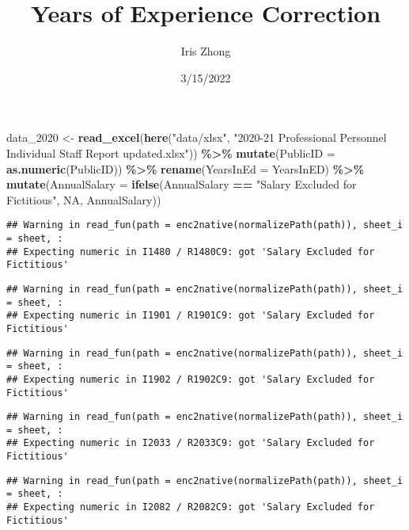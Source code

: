 \documentclass[
]{article}
\title{Years of Experience Correction}
\author{Iris Zhong}
\date{3/15/2022}
\newenvironment{Shaded}{\begin{snugshade}}{\end{snugshade}}
\newcommand{\DataTypeTok}[1]{\textcolor[rgb]{0.13,0.29,0.53}{#1}}
\newcommand{\DecValTok}[1]{\textcolor[rgb]{0.00,0.00,0.81}{#1}}
\newcommand{\KeywordTok}[1]{\textcolor[rgb]{0.13,0.29,0.53}{\textbf{#1}}}
\newcommand{\NormalTok}[1]{#1}
\newcommand{\OperatorTok}[1]{\textcolor[rgb]{0.81,0.36,0.00}{\textbf{#1}}}
\newcommand{\OtherTok}[1]{\textcolor[rgb]{0.56,0.35,0.01}{#1}}
\newcommand{\StringTok}[1]{\textcolor[rgb]{0.31,0.60,0.02}{#1}}
\begin{document}
\maketitle

\begin{Shaded}
\begin{Highlighting}[]
\NormalTok{data\_}\DecValTok{2020}\NormalTok{ \textless{}{-}}\StringTok{ }\KeywordTok{read\_excel}\NormalTok{(}\KeywordTok{here}\NormalTok{(}\StringTok{"data/xlsx"}\NormalTok{, }\StringTok{"2020{-}21 Professional Personnel Individual Staff Report updated.xlsx"}\NormalTok{)) }\OperatorTok{\%\textgreater{}\%}\StringTok{ }
\StringTok{  }\KeywordTok{mutate}\NormalTok{(}\DataTypeTok{PublicID =} \KeywordTok{as.numeric}\NormalTok{(PublicID)) }\OperatorTok{\%\textgreater{}\%}\StringTok{ }
\StringTok{  }\KeywordTok{rename}\NormalTok{(}\DataTypeTok{YearsInEd =}\NormalTok{ YearsInED) }\OperatorTok{\%\textgreater{}\%}
\StringTok{  }\KeywordTok{mutate}\NormalTok{(}\DataTypeTok{AnnualSalary =} \KeywordTok{ifelse}\NormalTok{(AnnualSalary }\OperatorTok{==}\StringTok{ "Salary Excluded for Fictitious"}\NormalTok{, }\OtherTok{NA}\NormalTok{, AnnualSalary))}
\end{Highlighting}
\end{Shaded}

\begin{verbatim}
## Warning in read_fun(path = enc2native(normalizePath(path)), sheet_i = sheet, :
## Expecting numeric in I1480 / R1480C9: got 'Salary Excluded for Fictitious'
\end{verbatim}

\begin{verbatim}
## Warning in read_fun(path = enc2native(normalizePath(path)), sheet_i = sheet, :
## Expecting numeric in I1901 / R1901C9: got 'Salary Excluded for Fictitious'
\end{verbatim}

\begin{verbatim}
## Warning in read_fun(path = enc2native(normalizePath(path)), sheet_i = sheet, :
## Expecting numeric in I1902 / R1902C9: got 'Salary Excluded for Fictitious'
\end{verbatim}

\begin{verbatim}
## Warning in read_fun(path = enc2native(normalizePath(path)), sheet_i = sheet, :
## Expecting numeric in I2033 / R2033C9: got 'Salary Excluded for Fictitious'
\end{verbatim}

\begin{verbatim}
## Warning in read_fun(path = enc2native(normalizePath(path)), sheet_i = sheet, :
## Expecting numeric in I2082 / R2082C9: got 'Salary Excluded for Fictitious'
\end{verbatim}
\end{document}
